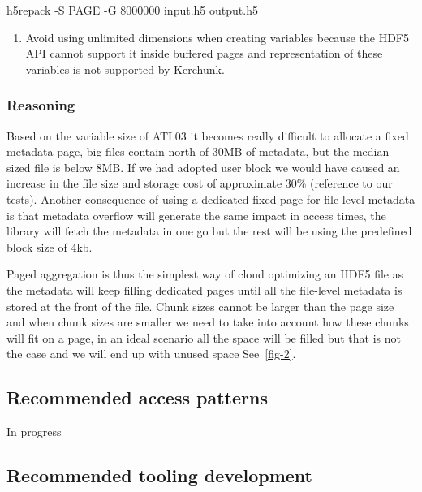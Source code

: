 \documentclass[
]{agujournal2019}
\newenvironment{Shaded}{\begin{snugshade}}{\end{snugshade}}
\newcommand{\AttributeTok}[1]{\textcolor[rgb]{0.40,0.45,0.13}{#1}}
\newcommand{\ExtensionTok}[1]{\textcolor[rgb]{0.00,0.23,0.31}{#1}}
\newcommand{\NormalTok}[1]{\textcolor[rgb]{0.00,0.23,0.31}{#1}}
\providecommand{\tightlist}{%
  \setlength{\itemsep}{0pt}\setlength{\parskip}{0pt}}\usepackage{longtable,booktabs,array}
\begin{document}
\begin{Shaded}
\begin{Highlighting}[]
 \ExtensionTok{h5repack} \AttributeTok{{-}S}\NormalTok{ PAGE }\AttributeTok{{-}G}\NormalTok{ 8000000 input.h5 output.h5}
\end{Highlighting}
\end{Shaded}

\begin{enumerate}
\def\labelenumi{\arabic{enumi}.}
\setcounter{enumi}{2}
\tightlist
\item
  Avoid using unlimited dimensions when creating variables because the
  HDF5 API cannot support it inside buffered pages and representation of
  these variables is not supported by Kerchunk.
\end{enumerate}

\subsubsection{Reasoning}\label{reasoning}

Based on the variable size of ATL03 it becomes really difficult to
allocate a fixed metadata page, big files contain north of 30MB of
metadata, but the median sized file is below 8MB. If we had adopted user
block we would have caused an increase in the file size and storage cost
of approximate 30\% (reference to our tests). Another consequence of
using a dedicated fixed page for file-level metadata is that metadata
overflow will generate the same impact in access times, the library will
fetch the metadata in one go but the rest will be using the predefined
block size of 4kb.

Paged aggregation is thus the simplest way of cloud optimizing an HDF5
file as the metadata will keep filling dedicated pages until all the
file-level metadata is stored at the front of the file. Chunk sizes
cannot be larger than the page size and when chunk sizes are smaller we
need to take into account how these chunks will fit on a page, in an
ideal scenario all the space will be filled but that is not the case and
we will end up with unused space See~\ref{fig-2}.

\subsection{Recommended access
patterns}\label{recommended-access-patterns}

In progress

\subsection{Recommended tooling
development}\label{recommended-tooling-development}
\end{document}
